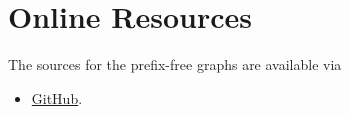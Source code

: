 \documentclass[twocolumn]{ceurart}
\begin{document}









\appendix

\section{Online Resources}

The sources for the prefix-free graphs are available via
\begin{itemize}
\item \href{https://github.com/andynet/pfg}{GitHub}.
\end{itemize}
\end{document}

